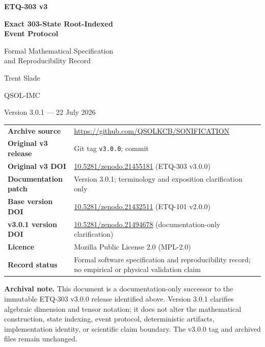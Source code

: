 \documentclass[11pt,a4paper]{article}
\theoremstyle{definition}
\newcommand{\hash}[1]{\texttt{\footnotesize\seqsplit{#1}}}
\begin{document}
\hypersetup{pageanchor=false}
\thispagestyle{empty}

\begin{center}
  \vspace*{22mm}
  {\fontsize{31}{36}\selectfont\bfseries\color{etqblue} ETQ-303 v3}\par
  \vspace{9mm}
  {\fontsize{22}{27}\selectfont\bfseries Exact 303-State Root-Indexed\\[1.5mm]Event Protocol}\par
  \vspace{14mm}
  {\Large Formal Mathematical Specification\\and Reproducibility Record}\par
  \vspace{22mm}
  {\large Trent Slade}\par
  {\large QSOL-IMC}\par
  \vspace{8mm}
  {\large Version 3.0.1 --- 22 July 2026}\par
\end{center}

\vfill
\small
\noindent
\begin{tabularx}{\textwidth}{@{}>{\bfseries}p{38mm}>{\raggedright\arraybackslash}X@{}}
Archive source & \url{https://github.com/QSOLKCB/SONIFICATION} \\
Original v3 release & Git tag \texttt{v3.0.0}; commit \hash{6b55e51647226d1c248dc8d79f9ed9336241c2ac} \\
Original v3 DOI & \href{https://doi.org/10.5281/zenodo.21455181}{10.5281/zenodo.21455181} (ETQ-303 v3.0.0) \\
Documentation patch & Version 3.0.1; terminology and exposition clarification only \\
Base version DOI & \href{https://doi.org/10.5281/zenodo.21432511}{10.5281/zenodo.21432511} (ETQ-101 v2.0.0) \\
v3.0.1 version DOI & \href{https://doi.org/10.5281/zenodo.21494678}{10.5281/zenodo.21494678} (documentation-only clarification) \\
Licence & Mozilla Public License 2.0 (MPL-2.0) \\
Record status & Formal software specification and reproducibility record; no empirical or physical validation claim \\
\end{tabularx}
\normalsize

\vspace{8mm}
\colorbox{etqlight}{\parbox{0.95\textwidth}{\textbf{Archival note.}
This document is a documentation-only successor to the immutable ETQ-303 v3.0.0 release identified above. Version 3.0.1 clarifies algebraic dimension and tensor notation; it does not alter the mathematical construction, state indexing, event protocol, deterministic artifacts, implementation identity, or scientific claim boundary. The v3.0.0 tag and archived files remain unchanged.}}
\end{document}
